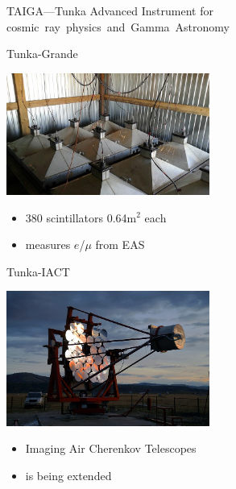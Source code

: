 \begin{frame}{TAIGA---Tunka Advanced Instrument for \mbox{cosmic ray physics and Gamma Astronomy}}
\vspace{-1ex}
\begin{minipage}[t]{0.48\textwidth}
  \begin{block}{\small Tunka-Grande}
    \parbox[c][0.21\textheight][t]{0.43\textwidth}{
      \includegraphics[width=0.50\textwidth]{pics/Hiller_Roman-005.jpg}
    }
    \hfill
    \parbox[c][0.21\textheight][t]{0.55\textwidth}{
      \begin{itemize}
        \setlength{\itemsep}{0pt}
        \item 380 scintillators 0.64m$^2$ each
        \item measures $e$/$\mu$ from EAS
      \end{itemize}
    }
  \end{block}
\end{minipage}
\hfill
\begin{minipage}[t]{0.48\textwidth}
  \begin{block}{\small Tunka-IACT}
    \parbox[c][0.21\textheight][t]{0.43\textwidth}{
      \includegraphics[width=0.50\textwidth]{pics/Tunka-Iact.jpg}
    }
    \hfill
    \parbox[c][0.21\textheight][t]{0.55\textwidth}{
      \begin{itemize}
        \setlength{\itemsep}{0pt}
        \item Imaging Air Cherenkov Telescopes
        \item is being extended
      \end{itemize}
    }
  \end{block}
\end{minipage}
\end{frame}
